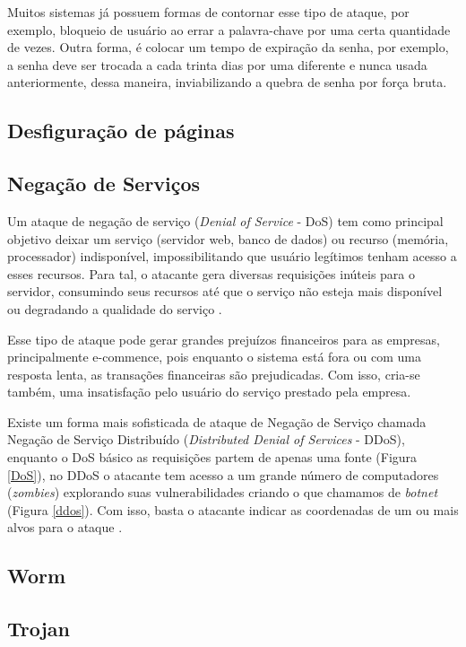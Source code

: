 \documentclass[
	12pt,				
	openright,		
	twoside,	
	a4paper,
	english,	
	brazil	
	]{abntex2}
\begin{document}
 Muitos sistemas já possuem formas de contornar esse tipo de ataque, por exemplo, bloqueio de usuário ao errar a palavra-chave por uma certa quantidade de vezes. Outra forma, é colocar um tempo de expiração da senha, por exemplo, a senha deve ser trocada a cada trinta dias por uma diferente e nunca usada anteriormente, dessa maneira, inviabilizando a quebra de senha por força bruta. 

 \subsection{Desfiguração de páginas} \label{sec:desfiguração}
 \subsection{Negação de Serviços} \label{sec:negação}
 
Um ataque de negação de serviço (\textit{Denial of Service} - DoS) tem como principal objetivo deixar um serviço (servidor web, banco de dados) ou recurso (memória, processador)  indisponível, impossibilitando que usuário legítimos tenham acesso a esses recursos. Para tal, o atacante gera diversas requisições inúteis para o servidor, consumindo seus recursos até que o serviço não esteja mais disponível ou degradando a qualidade do serviço \cite{cryptsec}.

Esse tipo de ataque pode gerar grandes prejuízos financeiros para as empresas, principalmente e-commence, pois enquanto o sistema está fora ou com uma resposta lenta, as transações financeiras são prejudicadas. Com isso, cria-se também, uma insatisfação pelo usuário do serviço prestado pela empresa.

Existe um forma mais sofisticada de ataque de Negação de Serviço chamada Negação de Serviço Distribuído (\textit{Distributed Denial of Services} - DDoS), enquanto o DoS básico as requisições partem de apenas uma fonte (Figura \ref{DoS}), no DDoS o atacante tem acesso a um grande número de computadores (\textit{zombies}) explorando suas vulnerabilidades criando o que chamamos de \textit{botnet} (Figura \ref{ddos}). Com isso, basta o atacante indicar as coordenadas de um ou mais alvos para o ataque \cite{zargarjoshitipper}. 

 \subsection{Worm} \label{sec:worm}
 \subsection{Trojan} \label{sec:trojan}
\end{document}
